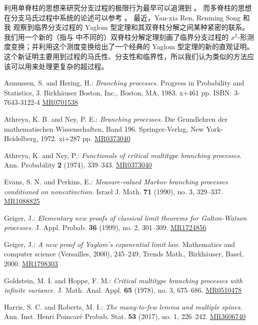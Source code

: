 \documentclass[12pt,a4paper]{article}
\theoremstyle{plain}
\theoremstyle{definition}
\numberwithin{equation}{section}
\def\MR#1{\href{http://www.ams.org/mathscinet-getitem?mr=#1}{MR#1}}
\begin{document}
	利用单脊柱的思想来研究分支过程的极限行为最早可以追溯到 \cite{LyonsPemantlePeres1995Conceptual}。
	而多脊柱的思想在分支马氏过程中系统的论述可以参考 \cite{HarrisRoberts2017The-many}。
	最近，Yan-xia Ren, Renming Song 和我 \cite{RenSongZhang2015Limit} 观察到临界分支过程的 Yaglom 型定理和其双脊柱分解之间某种紧密的联系。
	我们用一个新的（指与 \cite{HarrisRoberts2017The-many} 中不同的）双脊柱分解定理刻画了临界分支过程的 $x^2$-形测度变换；并利用这个测度变换给出了一个经典的 Yaglom 型定理的新的直观证明。
	这个新证明主要用到过程的马氏性、分支性和临界性，所以我们认为类似的方法应该可以用来处理更复杂的超过程。

\renewcommand{\refname}{参考文献}
\begin{thebibliography}{10}

Asmussen, S. and Hering, H.:
\emph{Branching processes.} 
Progress in Probability and Statistics, 3. Birkhäuser Boston, Inc., Boston, MA, 1983. x+461 pp. ISBN: 3-7643-3122-4 
\MR{0701538}

Athreya, K. B. and Ney, P. E.:
\emph{Branching processes.} 
Die Grundlehren der mathematischen Wissenschaften, Band 196. Springer-Verlag, New York-Heidelberg, 1972. xi+287 pp. 
\MR{0373040}

Athreya, K. and Ney, P.:
\emph{Functionals of critical multitype branching processes.}
Ann. Probability \textbf{2} (1974), 339–343. 
\MR{0373040}

Evans, S. N. and Perkins, E.:
\emph{Measure-valued Markov branching processes conditioned on nonextinction.}
Israel J. Math. \textbf{71} (1990), no. 3, 329–337.
\MR{1088825} 

Geiger, J.:
\emph{Elementary new proofs of classical limit theorems for Galton-Watson processes.}
J. Appl. Probab. \textbf{36} (1999), no. 2, 301--309.
\MR{1724856} 

Geiger, J.:
\emph{A new proof of Yaglom's exponential limit law.} 
Mathematics and computer science (Versailles, 2000), 245–249, Trends Math., Birkhäuser, Basel, 2000. 
\MR{1798303}

Goldstein, M. I. and Hoppe, F. M.:
\emph{Critical multitype branching processes with infinite variance.}
J. Math. Anal. Appl. \textbf{65} (1978), no. 3, 675--686.
\MR{0510478} 

Harris, S. C. and Roberts, M. I.:
\emph{The many-to-few lemma and multiple spines.} 
Ann. Inst. Henri Poincaré Probab. Stat. \textbf{53} (2017), no. 1, 226–242.
\MR{3606740} 


\end{thebibliography}
\end{document}
